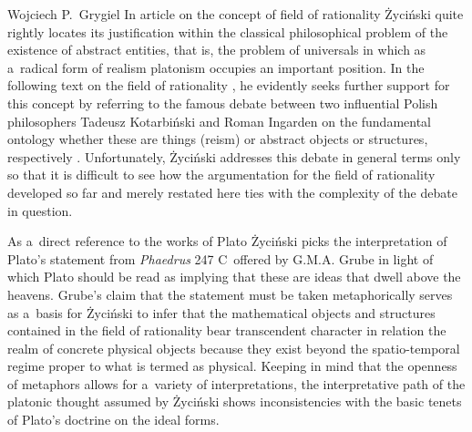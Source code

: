 \begin{artengenv}{Wojciech P.~Grygiel}
In article
\parencite[][]{zycinski_poza_1991} %
 on the concept of field of rationality Życiński quite rightly locates its justification within the classical philosophical problem of the existence of abstract entities, that is, the problem of universals in which as a~radical form of realism platonism occupies an important position. In the following text on the field of rationality 
\parencite[][]{zycinski_status_1995}, %
 he evidently seeks further support for this concept by referring to the famous debate between two influential Polish philosophers Tadeusz Kotarbiński and Roman Ingarden on the fundamental ontology whether these are things (reism) or abstract objects or structures, respectively 
\parencites[][]{kotarbinski_sprawa_1920}[][pp.483–507]{ingarden_z_1972}. %
 Unfortunately, Życiński addresses this debate in general terms only so that it is difficult to see how the argumentation for the field of rationality developed so far and merely restated here ties with the complexity of the debate in question.

As a~direct reference to the works of Plato Życiński picks the interpretation of Plato's statement from \textit{Phaedrus} 247 C~offered by G.M.A. Grube in light of which Plato should be read as implying that these are ideas that dwell above the heavens. Grube's claim
\parencite*[][pp.30–35]{grube_platos_1958} %
 that the statement must be taken metaphorically serves as a~basis for Życiński to infer that the mathematical objects and structures contained in the field of rationality bear transcendent character in relation the realm of concrete physical objects because they exist beyond the spatio-temporal regime proper to what is termed as physical. Keeping in mind that the openness of metaphors allows for a~variety of interpretations, the interpretative path of the platonic thought assumed by Życiński shows inconsistencies with the basic tenets of Plato's doctrine on the ideal forms.


\end{artengenv}
